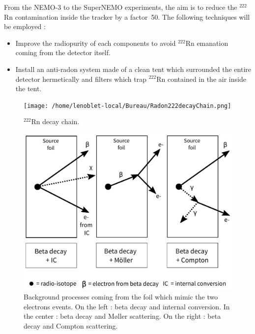\documentclass[main.tex]{subfiles}
\begin{document}
\bigskip


\noindent From the NEMO-3 to the SuperNEMO experiments, the aim is to reduce the $^{\text{222}}$Rn contamination inside the tracker by a factor~50. The following techniques will be employed :


\begin{itemize}

\item Improve the radiopurity of each components to avoid $^{\text{222}}$Rn emanation coming from the detector itself.

\item Install an anti-radon system made of a clean tent which surrounded the entire detector hermetically and filters which trap $^{\text{222}}$Rn contained in the air inside the tent. 

\end{itemize}


\begin{figure}[h!]
\begin{center}
\texttt{[image: /home/lenoblet-local/Bureau/Radon222decayChain.png]}
\caption{$^{\text{222}}$Rn decay chain.}
\label{Radon222decayChain}
\end{center}
\end{figure}


\begin{figure}[h!]
\begin{center}
\includegraphics[scale=0.4]{pictures/Chap5/internal_bkg.pdf}
\caption{Background processes coming from the foil which mimic the two electrons events. On the left : beta decay and internal conversion. In the center : beta decay and M\o ller scattering. On the right : beta decay and Compton scattering.}
\label{Backgroungs}
\end{center}
\end{figure}
\end{document}
